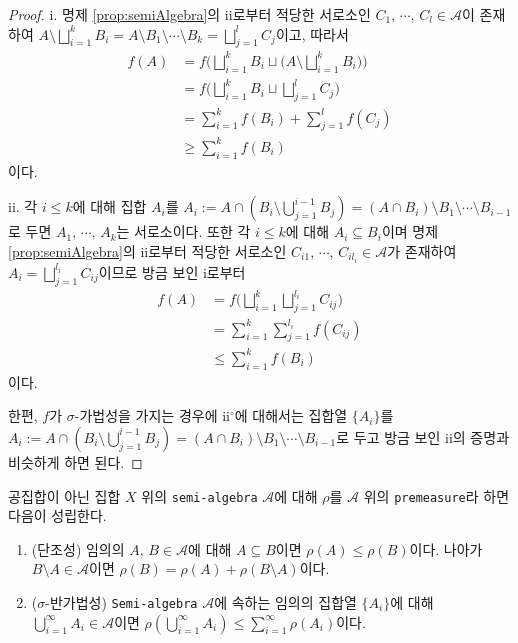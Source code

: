 \begin{proof}
    i. 명제 \ref{prop:semiAlgebra}의 ii로부터 적당한 서로소인 $C_1,\,\cdots,\,C_l\in\mathcal{A}$이 존재하여 $A\setminus\bigsqcup_{i=1}^kB_i=A\setminus B_1\setminus\cdots\setminus B_k=\bigsqcup_{j=1}^lC_j$이고, 따라서
    \begin{align*}
        f(A)&=f\bigg(\bigsqcup_{i=1}^kB_i\sqcup\bigg(A\setminus\bigsqcup_{i=1}^kB_i\bigg)\bigg)\\
        &=f\bigg(\bigsqcup_{i=1}^kB_i\sqcup\bigsqcup_{j=1}^lC_j\bigg)\\
        &=\sum_{i=1}^kf(B_i)+\sum_{j=1}^lf(C_j)\\
        &\geq\sum_{i=1}^kf(B_i)
    \end{align*}
    이다.

    ii. 각 $i\leq k$에 대해 집합 $A_i$를 $A_i:=A\cap(B_i\setminus\bigcup_{j=1}^{i-1}B_j)=(A\cap B_i)\setminus B_1\setminus\cdots\setminus B_{i-1}$로 두면 $A_1,\,\cdots,\,A_k$는 서로소이다. 또한 각 $i\leq k$에 대해 $A_i\subseteq B_i$이며 명제 \ref{prop:semiAlgebra}의 ii로부터 적당한 서로소인 $C_{i1},\,\cdots,\,C_{il_i}\in\mathcal{A}$가 존재하여 $A_i=\bigsqcup_{j=1}^{l_i}C_{ij}$이므로 방금 보인 i로부터
    \begin{align*}
        f(A)&=f\bigg(\bigsqcup_{i=1}^k\bigsqcup_{j=1}^{l_i}C_{ij}\bigg)\\
        &=\sum_{i=1}^k\sum_{j=1}^{l_i}f(C_{ij})\\
        &\leq\sum_{i=1}^kf(B_i)
    \end{align*}
      이다.

      한편, $f$가 $\sigma$-가법성을 가지는 경우에 ii$^\circ$에 대해서는 집합열 $\{A_i\}$를 $A_i:=A\cap(B_i\setminus\bigcup_{j=1}^{i-1}B_j)=(A\cap B_i)\setminus B_1\setminus\cdots\setminus B_{i-1}$로 두고 방금 보인 ii의 증명과 비슷하게 하면 된다.
\end{proof}

\begin{proposition}\label{prop:premeasure}
    공집합이 아닌 집합 $X$ 위의 \texttt{semi-algebra} $\mathcal{A}$에 대해 $\rho$를 $\mathcal{A}$ 위의 \texttt{premeasure}라 하면 다음이 성립한다.
    \begin{enumerate}
        \item (단조성) 임의의 $A,\,B\in\mathcal{A}$에 대해 $A\subseteq B$이면 $\rho(A)\leq\rho(B)$이다. 나아가 $B\setminus A\in\mathcal{A}$이면 $\rho(B)=\rho(A)+\rho(B\setminus A)$이다.
        \item ($\sigma$-반가법성) \texttt{Semi-algebra} $\mathcal{A}$에 속하는 임의의 집합열 $\{A_i\}$에 대해 $\bigcup_{i=1}^\infty A_i\in\mathcal{A}$이면 $\rho(\bigcup_{i=1}^\infty A_i)\leq\sum_{i=1}^\infty\rho(A_i)$이다.
    \end{enumerate}
\end{proposition}

